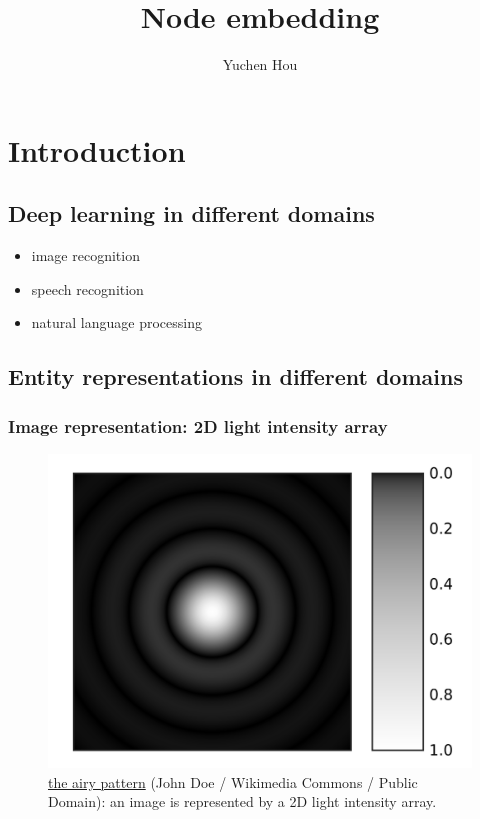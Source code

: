 \documentclass{article}
\begin{document}
\lstset{language=python, tabsize=4}
\title{Node embedding}
\author{Yuchen Hou}
\maketitle

\section{Introduction}

\subsection{Deep learning in different domains}
\begin{itemize}
	\item image recognition
	\item speech recognition
	\item natural language processing
\end{itemize}

\subsection{Entity representations in different domains}

\subsubsection{Image representation: 2D light intensity array}
\begin{figure}[H]
	\centering
	\includegraphics[width=0.5\linewidth]{Airy-pattern}
	\caption{\href{https://commons.wikimedia.org/wiki/File:Airy-pattern.svg}{the airy pattern} (John Doe / Wikimedia Commons / Public Domain): an image is represented by a 2D light intensity array.}
	\label{fig:Airy-pattern}
\end{figure}
\end{document}
